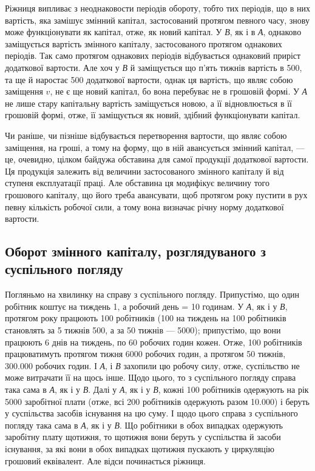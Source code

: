 Ріжниця випливає з неоднаковости періодів обороту, тобто тих періодів,
що в них вартість, яка замішує змінний капітал, застосований протягом
певного часу, знову може функціонувати як капітал, отже, як новий
капітал. У \emph{В}, як і в \emph{А}, однаково заміщується вартість змінного капіталу,
застосованого протягом однакових періодів. Так само протягом однакових
періодів відбувається однаковий приріст додаткової вартости. Але хоч у
\emph{В} й заміщується що п’ять тижнів вартість в 500, та ще й наростає
500 додаткової вартости, однак ця вартість, що являє собою
заміщення $v$, не є ще новий капітал, бо вона перебуває не в грошовій
формі. У \emph{А} не лише стару капітальну вартість заміщується новою, а її
відновлюється в її грошовій формі, отже, її заміщується як новий, здібний
функціонувати капітал.

Чи раніше, чи пізніше відбувається перетворення вартости, що являє
собою заміщення, на гроші, а тому на форму, що в ній авансується
змінний капітал, — це, очевидно, цілком байдужа обставина для самої
продукції додаткової вартости. Ця продукція залежить від величини застосованого
змінного капіталу й від ступеня експлуатації праці. Але обставина
ця модифікує величину того грошового капіталу, що його треба
авансувати, щоб протягом року пустити в рух певну кількість робочої
сили, а тому вона визначає річну норму додаткової вартости.

\subsection{Оборот змінного капіталу, розглядуваного з суспільного погляду}

Погляньмо на хвилинку на справу з суспільного погляду. Припустімо,
що один робітник коштує на тиждень 1, а робочий день = 10 годинам.
У \emph{А}, як і у \emph{В}, протягом року працюють 100 робітників (100 на тиждень на 100 робітників становлять за 5 тижнів 500, а
за 50 тижнів — 5000); припустімо, що вони працюють 6 днів на
тиждень, по 60 робочих годин кожен. Отже, 100 робітників працюватимуть
протягом тижня 6000 робочих годин, а протягом 50 тижнів, \num{300.000} робочих
годин. І \emph{А}, і \emph{В} захопили цю робочу силу, отже, суспільство не може витрачати
її на щось інше. Щодо цього, то з суспільного погляду справа
така сама в \emph{А}, як і у \emph{В}. Далі у \emph{А}, як і у \emph{В}, кожні 100 робітників одержують
на рік 5000 заробітної плати (отже, всі 200 робітників
одержують разом \num{10.000}) і беруть у суспільства засобів існування
на цю суму. І щодо цього справа з суспільного погляду така сама в
\emph{А}, як і у \emph{В}. Що робітники в обох випадках одержують заробітну плату
щотижня, то щотижня вони беруть у суспільства й засоби існування, за
які вони в обох випадках щотижня пускають у циркуляцію грошовий
еквівалент. Але відси починається ріжниця.

